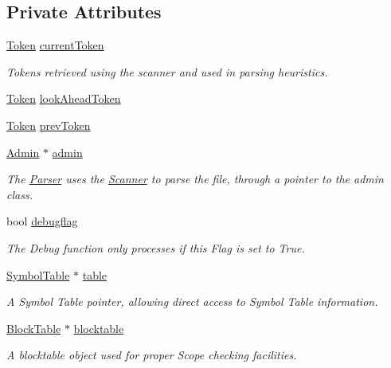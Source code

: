 \subsection*{Private Attributes}
\begin{DoxyCompactItemize}
\item 
\hyperlink{classToken}{Token} \hyperlink{classParser_a8180cecab442c4c7f582bbe1d0682bf1}{currentToken}
\begin{DoxyCompactList}\small\item\em Tokens retrieved using the scanner and used in parsing heuristics. \item\end{DoxyCompactList}\item 
\hyperlink{classToken}{Token} \hyperlink{classParser_a4f9e59e89197efefa1feff50f5ea8725}{lookAheadToken}
\item 
\hyperlink{classToken}{Token} \hyperlink{classParser_aa77efdbbc573c3c89169e199b996e0a1}{prevToken}
\item 
\hyperlink{classAdmin}{Admin} $\ast$ \hyperlink{classParser_a96a8ee1229f37648e0ee704827b1c4c7}{admin}
\begin{DoxyCompactList}\small\item\em The \hyperlink{classParser}{Parser} uses the \hyperlink{classScanner}{Scanner} to parse the file, through a pointer to the admin class. \item\end{DoxyCompactList}\item 
bool \hyperlink{classParser_a090a56f54cfd45240a039863b8289581}{debugflag}
\begin{DoxyCompactList}\small\item\em The Debug function only processes if this Flag is set to True. \item\end{DoxyCompactList}\item 
\hyperlink{classSymbolTable}{SymbolTable} $\ast$ \hyperlink{classParser_aa5635cdb5fc754cc3ea8b85eca02dfda}{table}
\begin{DoxyCompactList}\small\item\em A Symbol Table pointer, allowing direct access to Symbol Table information. \item\end{DoxyCompactList}\item 
\hyperlink{classBlockTable}{BlockTable} $\ast$ \hyperlink{classParser_a817d3fe67a8ee070f01fd759f8d5d30f}{blocktable}
\begin{DoxyCompactList}\small\item\em A blocktable object used for proper Scope checking facilities. \item\end{DoxyCompactList}\item 

\end{DoxyCompactItemize}
